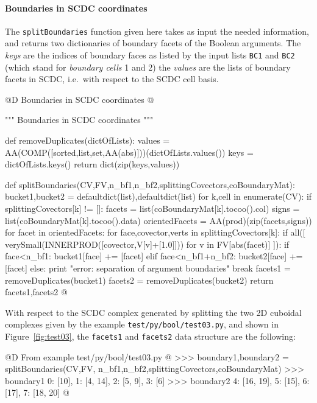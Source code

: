 \documentclass[11pt,oneside]{article}	%
\begin{document}
\paragraph{Boundaries in SCDC coordinates}
The \texttt{splitBoundaries} function given here takes as input the needed information, and returns two dictionaries of boundary facets of the Boolean arguments. The \emph{keys} are the indices of boundary faces as listed by the input lists \texttt{BC1} and \texttt{BC2} (which stand for \emph{boundary cells} 1 and 2) the \emph{values} are the lists of boundary facets in SCDC, i.e.~with respect to the SCDC cell basis.

@D Boundaries in SCDC coordinates
@{""" Boundaries in SCDC coordinates """

def removeDuplicates(dictOfLists):
	values = AA(COMP([sorted,list,set,AA(abs)]))(dictOfLists.values())
	keys = dictOfLists.keys()
	return dict(zip(keys,values))

def splitBoundaries(CV,FV,n_bf1,n_bf2,splittingCovectors,coBoundaryMat):
	bucket1,bucket2 = defaultdict(list),defaultdict(list) 
	for k,cell in enumerate(CV):
		if splittingCovectors[k] != []:
			facets = list(coBoundaryMat[k].tocoo().col)
			signs = list(coBoundaryMat[k].tocoo().data)
			orientedFacets = AA(prod)(zip(facets,signs))
			for facet in orientedFacets:
				for face,covector,verts in splittingCovectors[k]:
					if all([ verySmall(INNERPROD([covector,V[v]+[1.0]])) 
								for v in FV[abs(facet)] ]):
						if face<n_bf1: bucket1[face] += [facet]
						elif face<n_bf1+n_bf2: bucket2[face] += [facet]
						else: print "error: separation of argument boundaries"
						break		
	facets1 = removeDuplicates(bucket1)
	facets2 = removeDuplicates(bucket2)
	return facets1,facets2
@}

With respect to the SCDC complex generated by splitting the two 2D cuboidal complexes given by the example \texttt{test/py/bool/test03.py}, and shown in Figure~\ref{fig:test03}, the \texttt{facets1} and \texttt{facets2} data structure are the following:

@D From example test/py/bool/test03.py
@{
>>> boundary1,boundary2 = splitBoundaries(CV,FV,
							n_bf1,n_bf2,splittingCovectors,coBoundaryMat)
>>> boundary1
{0: [10], 1: [4, 14], 2: [5, 9], 3: [6]}
>>> boundary2
{4: [16, 19], 5: [15], 6: [17], 7: [18, 20]}
@}
\end{document}
